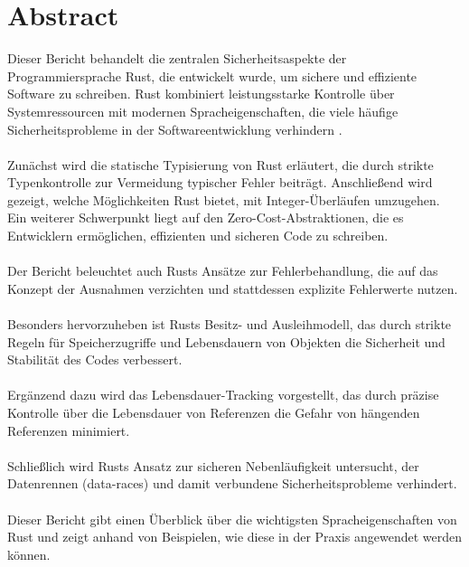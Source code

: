 \section*{Abstract}
\label{sec:abstract}

Dieser Bericht behandelt die zentralen Sicherheitsaspekte der Programmiersprache Rust, die entwickelt wurde, um sichere und effiziente Software zu schreiben. 
Rust kombiniert leistungsstarke Kontrolle über Systemressourcen mit modernen Spracheigenschaften, die viele häufige Sicherheitsprobleme in der Softwareentwicklung verhindern \cite{RustDoc2024}.\\
\\
Zunächst wird die statische Typisierung von Rust erläutert, die durch strikte Typenkontrolle zur Vermeidung typischer Fehler beiträgt. 
Anschließend wird gezeigt, welche Möglichkeiten Rust bietet, mit Integer-Überläufen umzugehen. 
Ein weiterer Schwerpunkt liegt auf den Zero-Cost-Abstraktionen, die es Entwicklern ermöglichen, effizienten und sicheren Code zu schreiben.\\
\\
Der Bericht beleuchtet auch Rusts Ansätze zur Fehlerbehandlung, die auf das Konzept der Ausnahmen verzichten und stattdessen explizite Fehlerwerte nutzen.\\
\\
Besonders hervorzuheben ist Rusts Besitz- und Ausleihmodell, das durch strikte Regeln für Speicherzugriffe und Lebensdauern von Objekten die Sicherheit und Stabilität des Codes verbessert. \\
\\
Ergänzend dazu wird das Lebensdauer-Tracking vorgestellt, das durch präzise Kontrolle über die Lebensdauer von Referenzen die Gefahr von hängenden Referenzen minimiert.\\
\\
Schließlich wird Rusts Ansatz zur sicheren Nebenläufigkeit untersucht, der Datenrennen (\glspl{data-race}) und damit verbundene Sicherheitsprobleme verhindert. \\
\\
Dieser Bericht gibt einen Überblick über die wichtigsten Spracheigenschaften von Rust und zeigt anhand von Beispielen, wie diese in der Praxis angewendet werden können.
